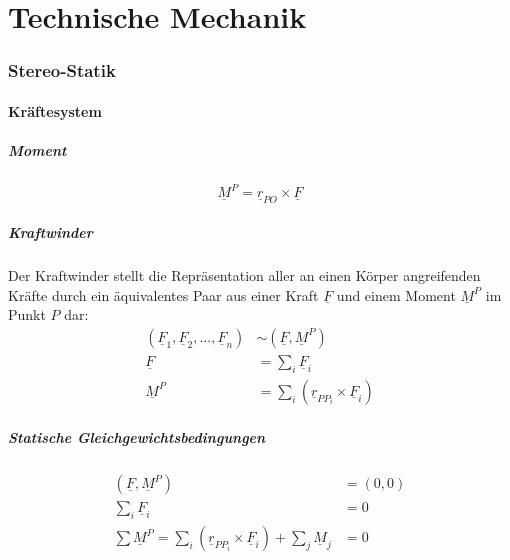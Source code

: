 \documentclass[a4paper,twocolumn,10pt]{article}
\begin{document}
\tableofcontents
\cleardoublepage

\part{Technische Mechanik}

\section{Stereo-Statik}

\subsection{Kräftesystem}

\subsubsection{Moment}

\begin{equation*}
\underline{M}^P=\underline{r}_{PO}\times\underline{F}
\end{equation*}

\subsubsection{Kraftwinder}
Der Kraftwinder stellt die Repräsentation aller an einen Körper angreifenden Kräfte durch ein äquivalentes Paar aus einer Kraft $\underline{F}$ und einem Moment $\underline{M}^P$ im Punkt $P$ dar:
\begin{equation*}
\begin{split}
(\underline{F}_1,\underline{F}_2,...,\underline{F}_n)&\sim (\underline{F},\underline{M}^P)\\
\underline{F}&=\sum\limits_{i}\underline{F}_i\\
\underline{M}^P&=\sum\limits_{i}(\underline{r}_{PP_{i}}\times \underline{F}_i)
\end{split}
\end{equation*}

\subsubsection{Statische Gleichgewichtsbedingungen}
\begin{equation*}
\begin{split}
(\underline{F},\underline{M}^P)&=(0,0)\\
\sum\limits_{i}\underline{F}_i&=0\\
\sum\underline{M}^P=\sum\limits_{i}(\underline{r}_{PP_i}\times\underline{F}_i)+\sum\limits_{j}\underline{M}_j&=0
\end{split}
\end{equation*}
\end{document}

